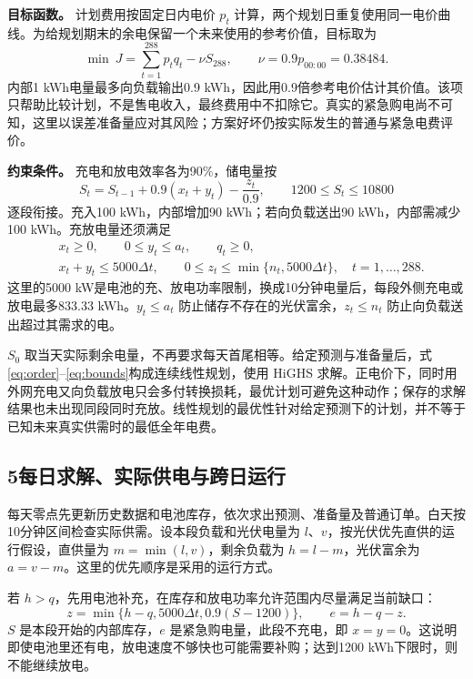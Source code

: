 \textbf{目标函数。} 计划费用按固定日内电价 $p_t$ 计算，两个规划日重复使用同一电价曲线。为给规划期末的余电保留一个未来使用的参考价值，目标取为
\begin{equation}
\min\ J=\sum_{t=1}^{288}p_tq_t-\nu S_{288},\qquad
\nu=0.9p_{00:00}=0.38484.
\label{eq:objective}
\end{equation}
内部1 kWh电量最多向负载输出0.9 kWh，因此用0.9倍参考电价估计其价值。该项只帮助比较计划，不是售电收入，最终费用中不扣除它。真实的紧急购电尚不可知，这里以误差准备量应对其风险；方案好坏仍按实际发生的普通与紧急电费评价。

\textbf{约束条件。} 充电和放电效率各为90\%，储电量按
\begin{equation}
S_t=S_{t-1}+0.9(x_t+y_t)-\frac{z_t}{0.9},\qquad
1200\le S_t\le10800
\label{eq:storage}
\end{equation}
逐段衔接。充入100 kWh，内部增加90 kWh；若向负载送出90 kWh，内部需减少100 kWh。充放电量还须满足
\begin{equation}
\begin{aligned}
&x_t\ge0,\qquad 0\le y_t\le a_t,\qquad q_t\ge0,\\
&x_t+y_t\le5000\Delta t,\qquad
0\le z_t\le\min\{n_t,5000\Delta t\},\quad t=1,\ldots,288.
\end{aligned}
\label{eq:bounds}
\end{equation}
这里的5000 kW是电池的充、放电功率限制，换成10分钟电量后，每段外侧充电或放电最多833.33 kWh。$y_t\le a_t$ 防止储存不存在的光伏富余，$z_t\le n_t$ 防止向负载送出超过其需求的电。

$S_0$ 取当天实际剩余电量，不再要求每天首尾相等。给定预测与准备量后，式\eqref{eq:order}--\eqref{eq:bounds}构成连续线性规划，使用 HiGHS 求解。正电价下，同时用外网充电又向负载放电只会多付转换损耗，最优计划可避免这种动作；保存的求解结果也未出现同段同时充放。线性规划的最优性针对给定预测下的计划，并不等于已知未来真实供需时的最低全年电费。

\subsection*{5\quad 每日求解、实际供电与跨日运行}

每天零点先更新历史数据和电池库存，依次求出预测、准备量及普通订单。白天按10分钟区间检查实际供需。设本段负载和光伏电量为 $l$、$v$，按光伏优先直供的运行假设，直供量为 $m=\min(l,v)$，剩余负载为 $h=l-m$，光伏富余为 $a=v-m$。这里的优先顺序是采用的运行方式。

若 $h>q$，先用电池补充，在库存和放电功率允许范围内尽量满足当前缺口：
\begin{equation}
z=\min\{h-q,5000\Delta t,0.9(S-1200)\},\qquad e=h-q-z.
\label{eq:emergency}
\end{equation}
$S$ 是本段开始的内部库存，$e$ 是紧急购电量，此段不充电，即 $x=y=0$。这说明即使电池里还有电，放电速度不够快也可能需要补购；达到1200 kWh下限时，则不能继续放电。

